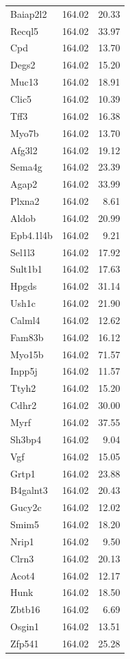 \documentclass{article}
\begin{document}
\begin{longtable}{lrr}
  Baiap2l2 & 164.02 & 20.33 \\ 
  Recql5 & 164.02 & 33.97 \\ 
  Cpd & 164.02 & 13.70 \\ 
  Degs2 & 164.02 & 15.20 \\ 
  Muc13 & 164.02 & 18.91 \\ 
  Clic5 & 164.02 & 10.39 \\ 
  Tff3 & 164.02 & 16.38 \\ 
  Myo7b & 164.02 & 13.70 \\ 
  Afg3l2 & 164.02 & 19.12 \\ 
  Sema4g & 164.02 & 23.39 \\ 
  Agap2 & 164.02 & 33.99 \\ 
  Plxna2 & 164.02 & 8.61 \\ 
  Aldob & 164.02 & 20.99 \\ 
  Epb4.1l4b & 164.02 & 9.21 \\ 
  Sel1l3 & 164.02 & 17.92 \\ 
  Sult1b1 & 164.02 & 17.63 \\ 
  Hpgds & 164.02 & 31.14 \\ 
  Ush1c & 164.02 & 21.90 \\ 
  Calml4 & 164.02 & 12.62 \\ 
  Fam83b & 164.02 & 16.12 \\ 
  Myo15b & 164.02 & 71.57 \\ 
  Inpp5j & 164.02 & 11.57 \\ 
  Ttyh2 & 164.02 & 15.20 \\ 
  Cdhr2 & 164.02 & 30.00 \\ 
  Myrf & 164.02 & 37.55 \\ 
  Sh3bp4 & 164.02 & 9.04 \\ 
  Vgf & 164.02 & 15.05 \\ 
  Grtp1 & 164.02 & 23.88 \\ 
  B4galnt3 & 164.02 & 20.43 \\ 
  Gucy2c & 164.02 & 12.02 \\ 
  Smim5 & 164.02 & 18.20 \\ 
  Nrip1 & 164.02 & 9.50 \\ 
  Clrn3 & 164.02 & 20.13 \\ 
  Acot4 & 164.02 & 12.17 \\ 
  Hunk & 164.02 & 18.50 \\ 
  Zbtb16 & 164.02 & 6.69 \\ 
  Osgin1 & 164.02 & 13.51 \\ 
  Zfp541 & 164.02 & 25.28 \\ 

\end{longtable}
\end{document}
